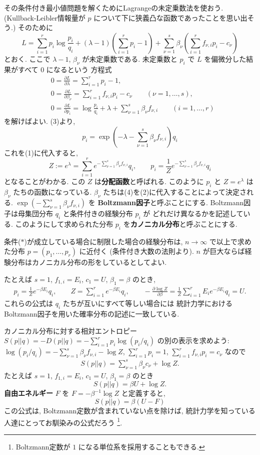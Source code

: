 \documentclass[12pt,twoside]{jarticle}
\renewcommand\d{\partial}
\theoremstyle{jplain}
\theoremstyle{jplain}
\theoremstyle{jplain}
\numberwithin{theorem}{section}
\numberwithin{equation}{section}
\numberwithin{figure}{section}
\numberwithin{table}{section}
\begin{document}
その条件付き最小値問題を解くためにLagrangeの未定乗数法を使おう.
(Kullback-Leibler情報量が $p$ について下に狭義凸な函数であったことを思い出そう.)
そのために
\[
L
= \sum_{i=1}^r p_i \log\frac{p_i}{q_i}
+ (\lambda-1)\left(\sum_{i=1}^r p_i-1\right)
+ \sum_{\nu=1}^s\beta_\nu\left(\sum_{i=1}^r f_{\nu,i}p_i - c_\nu \right)
\]
とおく. ここで $\lambda-1$, $\beta_\nu$ が未定乗数である.
未定乗数と $p_i$ で $L$ を偏微分した結果がすべて $0$ になるという
方程式
\begin{align*}
&
0=\frac{\d L}{\d\lambda} = \sum_{i=1}^r p_i - 1,
\tag{1}
\\ &
0=\frac{\d L}{\d\beta_\nu} = \sum_{i=1}^r f_{\nu,i}p_i - c_\nu
\qquad (\nu=1,\ldots,s),
\tag{2}
\\ &
0=\frac{\d L}{\d p_i} = \log\frac{p_i}{q_i} + \lambda + \sum_{\nu=1}^s \beta_\nu f_{\nu,i}
\qquad (i=1,\ldots,r)
\tag{3}
\end{align*}
を解けばよい. (3)より,
\[
p_i = \exp\left(-\lambda-\sum_{\nu=1}^s \beta_\nu f_{\nu,i} \right)q_i
\]
これを(1)に代入すると,
\[
Z:= e^\lambda
= \sum_{i=1}^r e^{-\sum_{\nu=1}^s \beta_\nu f_{\nu,i}}q_i,
\qquad
p_i = \frac{1}{Z}e^{-\sum_{\nu=1}^s \beta_\nu f_{\nu,i}}q_i
\tag{4}
\]
となることがわかる. この $Z$ は{\bfseries 分配函数}と呼ばれる.
このように $p_i$ と $Z=e^\lambda$ は $\beta_\nu$ たちの函数になっている.
$\beta_\nu$ たちは(4)を(2)に代入することによって決定される.
$\exp\left(-\sum_{\nu=1}^s \beta_\nu f_{\nu,i}\right)$ を
{\bfseries Boltzmann因子}と呼ぶことにする.
Boltzmann因子は母集団分布 $q_i$ と条件付きの経験分布 $p_i$ が
どれだけ異なるかを記述している.
このようにして求められた分布 $p_i$ を{\bfseries カノニカル分布}と呼ぶことにする.

条件($*$)が成立している場合に制限した場合の経験分布は,
$n\to\infty$ で以上で求めた分布 $p=(p_1,\ldots,p_r)$ に近付く
(条件付き大数の法則より).
$n$ が巨大ならば経験分布はカノニカル分布の形をしているとしてよい.

たとえば $s=1$, $f_{1,i}=E_i$, $c_1=U$, $\beta_1=\beta$ のとき,
\begin{align*}
p_i = \frac{1}{Z}e^{-\beta E_i}q_i,
\qquad
Z = \sum_{i=1}^r e^{-\beta E_i}q_i,
\qquad
-\frac{\d\log Z}{\d\beta}
= \frac{1}{Z} \sum_{i=1}^r E_i e^{-\beta E_i}q_i = U.
\end{align*}
これらの公式は $q_i$ たちが互いにすべて等しい場合には
統計力学におけるBoltzmann因子を用いた確率分布の記述に一致している.

カノニカル分布に対する相対エントロピー $S(p||q)=-D(p||q)=-\sum_{i=1}^r p_i\log(p_i/q_i)$
の別の表示を求めよう:
$\log(p_i/q_i)=-\sum_{\nu=1}^s\beta_\nu f_{\nu,i}-\log Z$, $\sum_{i=1}^r p_i=1$,
$\sum_{i=1}^r f_{\nu,i}p_i=c_\nu$ なので
\begin{align*}
S(p||q) = \sum_{\nu=1}^s \beta_\nu c_\nu + \log Z.
\end{align*}
たとえば $s=1$, $f_{1,i}=E_i$, $c_1=U$, $\beta_1=\beta$ のとき
\[
S(p||q) = \beta U + \log Z.
\]
{\bfseries 自由エネルギー} $F$ を $F=-\beta^{-1}\log Z$ と定義すると,
\[
S(p||q) = \beta(U-F)
\]
この公式は, Boltzmann定数が含まれていない点を除けば,
統計力学を知っている人達にとってお馴染みの公式だろう%
\footnote{Boltzmann定数が $1$ になる単位系を採用することもできる.}.
\end{document}
